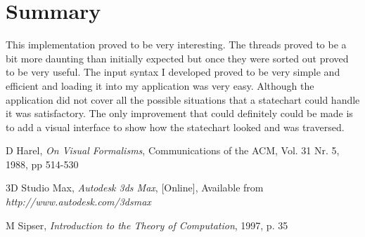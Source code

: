 \documentclass[a4paper,11pt,titlepage]{article}
\begin{document}
\section{Summary}
This implementation proved to be very interesting. The threads proved to be a bit more daunting than initially expected but once they were sorted out proved to be very useful. The input syntax I developed proved to be very simple and efficient and loading it into my application was very easy. Although the application did not cover all the possible situations that a statechart could handle it was satisfactory. The only improvement that could definitely could be made is to add a visual interface to show how the statechart looked and was traversed.


\begin{thebibliography}{9}
 D Harel,
\emph{On Visual Formalisms}, 
Communications of the ACM, Vol. 31 Nr. 5, 1988, pp 514-530

 3D Studio Max,
\emph{Autodesk 3ds Max},	
[Online], Available from \emph{http://www.autodesk.com/3dsmax }

 M Sipser,
\emph{Introduction to the Theory of Computation},
1997, p. 35


\end{thebibliography}
\end{document}

